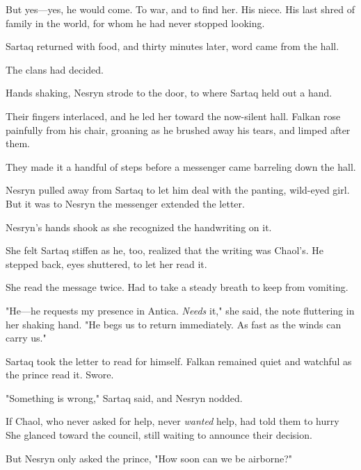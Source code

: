 But yes---yes, he would come. To war, and to find her. His niece. His last shred of family in the world, for whom he had never stopped looking.

Sartaq returned with food, and thirty minutes later, word came from the hall.

The clans had decided.

Hands shaking, Nesryn strode to the door, to where Sartaq held out a hand.

Their fingers interlaced, and he led her toward the now-silent hall. Falkan rose painfully from his chair, groaning as he brushed away his tears, and limped after them.

They made it a handful of steps before a messenger came barreling down the hall.

Nesryn pulled away from Sartaq to let him deal with the panting, wild-eyed girl. But it was to Nesryn the messenger extended the letter.

Nesryn's hands shook as she recognized the handwriting on it.

She felt Sartaq stiffen as he, too, realized that the writing was Chaol's. He stepped back, eyes shuttered, to let her read it.

She read the message twice. Had to take a steady breath to keep from vomiting.

"He---he requests my presence in Antica. \emph{Needs} it," she said, the note fluttering in her shaking hand. "He begs us to return immediately. As fast as the winds can carry us."

Sartaq took the letter to read for himself. Falkan remained quiet and watchful as the prince read it. Swore.

"Something is wrong," Sartaq said, and Nesryn nodded.

If Chaol, who never asked for help, never \emph{wanted} help, had told them to hurry  She glanced toward the council, still waiting to announce their decision.

But Nesryn only asked the prince, "How soon can we be airborne?"

